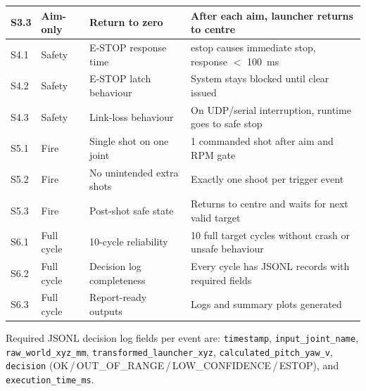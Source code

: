 {\begin{longtable}{|l|l|p{4.5cm}|p{5.5cm}|}
\hline
S3.3 & Aim-only & Return to zero & After each aim, launcher returns to centre \\
\hline
S4.1 & Safety & E-STOP response time & estop causes immediate stop, response $<$ 100~ms \\
\hline
S4.2 & Safety & E-STOP latch behaviour & System stays blocked until clear issued \\
\hline
S4.3 & Safety & Link-loss behaviour & On UDP/serial interruption, runtime goes to safe stop \\
\hline
S5.1 & Fire & Single shot on one joint & 1 commanded shot after aim and RPM gate \\
\hline
S5.2 & Fire & No unintended extra shots & Exactly one shoot per trigger event \\
\hline
S5.3 & Fire & Post-shot safe state & Returns to centre and waits for next valid target \\
\hline
S6.1 & Full cycle & 10-cycle reliability & 10 full target cycles without crash or unsafe behaviour \\
\hline
S6.2 & Full cycle & Decision log completeness & Every cycle has JSONL records with required fields \\
\hline
S6.3 & Full cycle & Report-ready outputs & Logs and summary plots generated \\
\hline
\end{longtable}
}

Required JSONL decision log fields per event are: \texttt{timestamp}, \texttt{input\_joint\_name}, \texttt{raw\_world\_xyz\_mm}, \texttt{transformed\_launcher\_xyz}, \texttt{calculated\_pitch\_yaw\_v}, \texttt{decision} (OK\,/\,OUT\_OF\_RANGE\,/\,LOW\_CONFIDENCE\,/\,ESTOP), and \texttt{execution\_time\_ms}.
